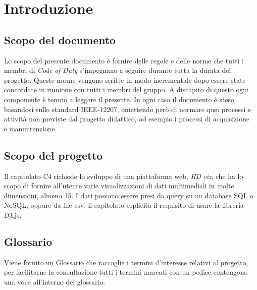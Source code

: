 \section{Introduzione}
    \subsection{Scopo del documento}
    Lo scopo del presente documento è fornire delle regole e delle norme che tutti i membri di \textit{Code of Duty} s'impegnano a seguire durante tutta la durata del progetto. Queste norme vengono scritte in modo incrementale dopo essere state concordate in riunione con tutti i membri del gruppo.
    A discapito di questo ogni componente è tenuto a leggere il presente.
    In ogni caso il documento è steso basandosi sullo standard IEEE-12207, omettendo però di normare quei processi e attività non previste dal progetto didattico, ad esempio i processi di acquisizione e manuntenzione. 
    \subsection{Scopo del progetto}
    Il capitolato C4 richiede lo sviluppo di una piattaforma web, \textit{HD viz}, che ha lo scopo di fornire all'utente varie visualizzazioni di dati multimediali in molte dimensioni, almeno 15. I dati possono essere presi da query su un database SQL o NoSQL, oppure da file csv. il capitolato esplicita il requisito di usare la libreria D3.js.
    \subsection{Glossario}
    Viene fornito un Glossario che raccoglie i termini d'interesse relativi al progetto, per facilitarne la consultazione tutti i termini marcati con un pedice \glo{} contengono una voce all'interno del glossario.